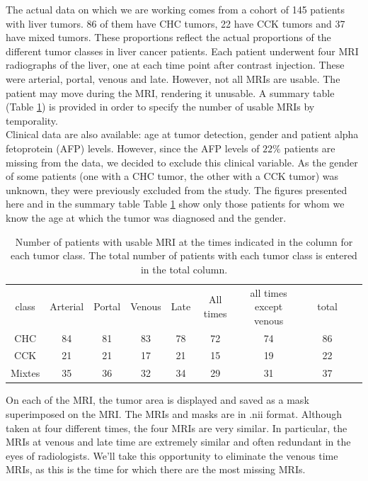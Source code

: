 \documentclass[preprint,12pt]{elsarticle}
\begin{document}
The actual data on which we are working comes from a cohort of 145 patients with liver tumors. 86 of them have CHC tumors, 22 have CCK tumors and 37 have mixed tumors. These proportions reflect the actual proportions of the different tumor classes in liver cancer patients. Each patient underwent four MRI radiographs of the liver, one at each time point after contrast injection. These were arterial, portal, venous and late. However, not all MRIs are usable. The patient may move during the MRI, rendering it unusable. A summary table (Table \ref{tab:nb_tumeurs}) is provided in order to specify the number of usable MRIs by temporality.\\
\indent Clinical data are also available: age at tumor detection, gender and patient alpha fetoprotein (AFP) levels. However, since the AFP levels of $22\%$ patients are missing from the data, we decided to exclude this clinical variable. As the gender of some patients (one with a CHC tumor, the other with a CCK tumor) was unknown, they were previously excluded from the study. The figures presented here and in the summary table Table \ref{tab:nb_tumeurs} show only those patients for whom we know the age at which the tumor was diagnosed and the gender.\\
\begin{table}[tbp]
    \centering
    \caption{Number of patients with usable MRI at the times indicated in the column for each tumor class. The total number of patients with each tumor class is entered in the total column.}
    \label{tab:nb_tumeurs}
    \begin{tabular}{|c|c|c|c|c|c|c|c|c|c|c|}
        \cline{1-7} \cline{9-9}
        class & Arterial & Portal & Venous & Late & All times & all times except venous& & total \\
        \cline{1-7} \cline{9-9}
        CHC & 84 & 81 & 83 & 78 & 72 & 74 & & 86\\
        \cline{1-7} \cline{9-9}
        CCK & 21 & 21 & 17 & 21 & 15 & 19 & & 22\\
        \cline{1-7} \cline{9-9}
        Mixtes & 35 & 36 & 32 & 34 & 29 & 31 & & 37\\
        \cline{1-7} \cline{9-9}
    \end{tabular}
\end{table}
\indent On each of the MRI, the tumor area is displayed and saved as a mask superimposed on the MRI. The MRIs and masks are in .nii format. Although taken at four different times, the four MRIs are very similar. In particular, the MRIs at venous and late time are extremely similar and often redundant in the eyes of radiologists. We'll take this opportunity to eliminate the venous time MRIs, as this is the time for which there are the most missing MRIs.
\end{document}
